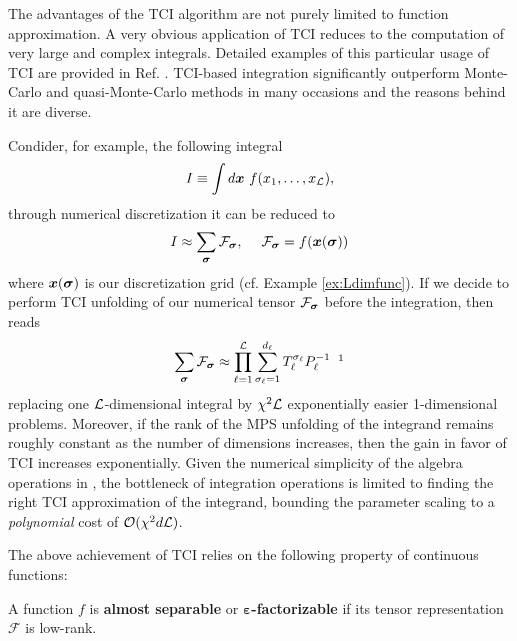 The advantages of the TCI algorithm are not purely limited to function approximation. A very obvious application of TCI reduces to the computation of very large and complex integrals. Detailed examples of this particular usage of TCI are provided in Ref. \cite{Fernandez2022, Fernandez2024, Dolgov2020}. TCI-based integration significantly outperform Monte-Carlo and quasi-Monte-Carlo methods in many occasions and the reasons behind it are diverse. 

Condider, for example, the following integral
\begin{equation}
	I \equiv \int d\boldsymbol{x} \ f(x_1,\dots,x_\mL),
	\label{eq:LdimIntegral}
\end{equation}
through numerical discretization it can be reduced to 
\begin{equation}
	I \approx \sum_{\boldsymbol{\sigma}} \mathcal{F}_{\boldsymbol{\sigma}} ,\quad \; \mathcal{F}_{\boldsymbol{\sigma}} = f(\boldsymbol{x}(\boldsymbol{\sigma}))
	\label{eq:LdimapproxIntegral}
\end{equation}
where $\boldsymbol{x}(\boldsymbol{\sigma})$ is our discretization grid (cf. Example \ref{ex:Ldimfunc}). If we decide to perform TCI unfolding of our numerical tensor $\mathcal{F}_{\boldsymbol{\sigma}}$ before the integration,  then reads
\begin{equation}
	\sum_{\bsigma} \mathcal{F}_{\bsigma} \approx \prod_{\ell=1}^\mL \sum^{d_\ell}_{\sigma_\ell = 1} T^{\sigma_\ell}_\ell P^{-1}_\ell \; \;\footnotemark
	\label{eq:LdimTCIIntegral}
\end{equation}
replacing one $\mathcal{L}$-dimensional integral by $\chi^2\mathcal{L}$ exponentially easier 1-dimensional problems. Moreover, if the rank of the MPS unfolding of the integrand remains roughly constant as the number of dimensions increases, then the gain in favor of TCI increases exponentially. Given the numerical simplicity of the algebra operations in , the bottleneck of integration operations is limited to finding the right TCI approximation of the integrand, bounding the parameter scaling to a \textit{polynomial} cost of $\mathcal{O} (\chi^2d\mathcal{L})$. 


The above achievement of TCI relies on the following property of continuous functions:
\begin{definition}
	A function $f$ is {\normalfont \textbf{almost separable}} \cite{Fernandez2024} or {\normalfont \textbf{$\boldsymbol{\varepsilon}$-factorizable}} \cite{Fernandez2022} if its tensor representation $\mathcal{F}$ is low-rank.
	\label{def:separfunc}
\end{definition}

